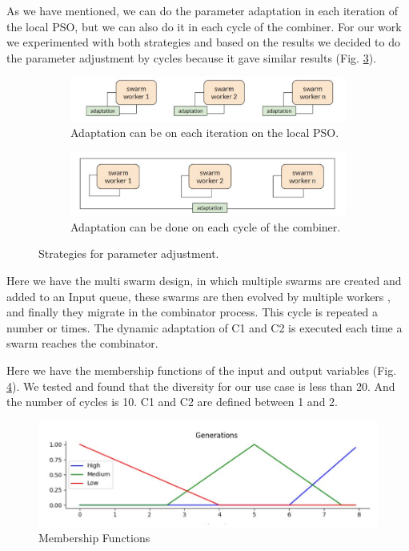 \documentclass[runningheads]{llncs}
\begin{document}
As we have mentioned, we can do the parameter adaptation in each iteration of the local PSO, but we can also do it in each cycle of the combiner. For our work we experimented  with both strategies and based on the results we decided to do the parameter adjustment by cycles because it gave similar results (Fig. \ref{fig:adap}).

\begin{figure}[ht]
  \centering
  \begin{subfigure}{0.8\textwidth}
    \includegraphics[angle=0,width=1\textwidth]{adaptation local.pdf}
    \caption{Adaptation can be on each iteration on the local PSO.}
    \label{fig:adap_local} 
  \end{subfigure}

  \begin{subfigure}{0.8\textwidth}
     \includegraphics[angle=0,width=1\textwidth]{adaptation combiner.pdf}
     \caption{Adaptation can be done on each cycle of the combiner.}
     \label{fig:adap_combiner} 
  \end{subfigure}
\caption{Strategies for parameter adjustment.}
\label{fig:adap}
\end{figure}

Here we have the multi swarm design, in which multiple swarms are created and added to an Input queue, these swarms are then evolved by multiple workers , and finally they migrate in the combinator process. This cycle is repeated a number or times. The dynamic adaptation of C1 and C2 is executed each time a swarm reaches the combinator.

Here we have the membership functions of the input and output variables (Fig. \ref{fig:member}). 
We tested and found that the diversity for our use case is less than 20. And the number of cycles is 10. C1 and C2 are defined between 1 and 2.

\begin{figure}
  \centering
  \includegraphics[angle=0,width=1\textwidth]{FM generation.pdf}
  \caption{Membership Functions}
  \label{fig:member} 
\end{figure}
\end{document}
